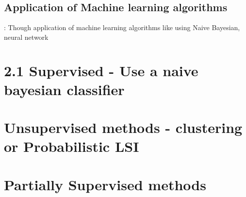 \documentclass[11pt]{article}
\begin{document}
\subsection{Application of Machine learning algorithms}: 
Though application of machine learning algorithms like using Naive Bayesian,
neural network 



\section{2.1 Supervised - Use a naive bayesian classifier}
\section{Unsupervised methods - clustering or Probabilistic LSI}
\section{Partially Supervised methods}





\end{document}
